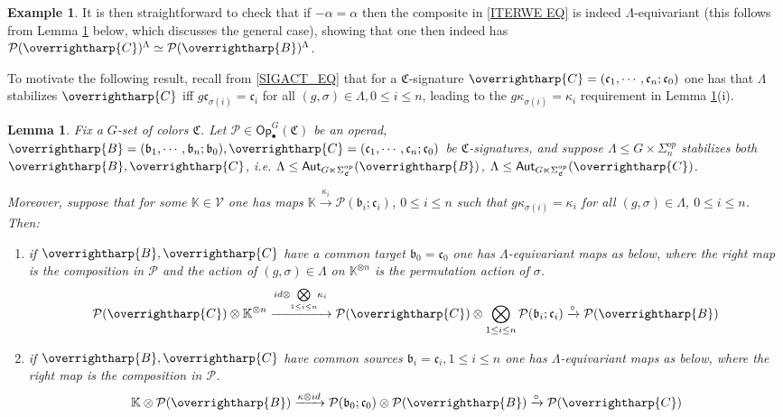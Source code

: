 \documentclass[a4paper,10pt
,draft
]{article}%
\numberwithin{equation}{section}
\numberwithin{figure}{section}
\newtheorem{lemma}[equation]{Lemma}%
\theoremstyle{definition} %
\newtheorem{example}[equation]{Example}%
\newcommand{\vect}[1]{\text{\overrightharp{\ensuremath{#1}}}}
\newcommand{\V}{\ensuremath{\mathcal V}}
\renewcommand{\P}{\ensuremath{\mathcal P}}
\newcommand{\1}{\ensuremath{\mathbbm 1}}%
\begin{document}
\begin{example}
It is then straightforward to check that if $-\alpha = \alpha$
then the composite in \eqref{ITERWE EQ}
is indeed $\Lambda$-equivariant
(this follows from Lemma \ref{LAMBEQMAPS LEM} below, which discusses the general case), showing that one then indeed has
$\P(\vect{C})^{\Lambda} \simeq \P(\vect{B})^{\Lambda}$.
\end{example}


To motivate the following result, 
recall from \eqref{SIGACT_EQ} that
for a $\mathfrak{C}$-signature
$\vect{C} = (\mathfrak{c}_1,\cdots,\mathfrak{c}_n;\mathfrak{c}_0)$
one has that $\Lambda$ stabilizes $\vect{C}$
iff 
$g \mathfrak{c}_{\sigma(i)} = \mathfrak{c}_i$
for all $(g,\sigma) \in \Lambda, 0\leq i \leq n$,
leading to the $g \kappa_{\sigma(i)} = \kappa_i$
requirement in Lemma \ref{LAMBEQMAPS LEM}(i).



\begin{lemma}\label{LAMBEQMAPS LEM}
Fix a $G$-set of colors $\mathfrak{C}$.
Let $\P \in \mathsf{Op}^G_\bullet(\mathfrak{C})$ be an operad,
$\vect{B}=(\mathfrak{b}_1,\cdots,\mathfrak{b}_n;\mathfrak{b}_0),\vect{C}=(\mathfrak{c}_1,\cdots,\mathfrak{c}_n;\mathfrak{c}_0)$ be $\mathfrak{C}$-signatures,
and suppose 
$\Lambda \leq G \times \Sigma_n^{op}$
stabilizes both $\vect{B},\vect{C}$, i.e. 
$\Lambda \leq \mathsf{Aut}_{G\ltimes \Sigma_{\mathfrak{C}}^{op}}(\vect{B})$, 
$\Lambda \leq \mathsf{Aut}_{G\ltimes \Sigma_{\mathfrak{C}}^{op}}(\vect{C})$.

Moreover, suppose that for some $\mathbb{K} \in \V$
one has maps 
$\mathbb{K} \xrightarrow{\kappa_i} \P(\mathfrak{b}_i;\mathfrak{c}_i)$,  $0\leq i \leq n$
such that $g\kappa_{\sigma(i)} = \kappa_i$ for all $(g,\sigma) \in \Lambda$, $0\leq i \leq n$. Then:
\begin{enumerate}[label=(\roman*)]
\item if $\vect{B},\vect{C}$ have a common target $\mathfrak{b}_0=\mathfrak{c}_0$
one has
$\Lambda$-equivariant maps as below, where the right map is the composition in $\P$
and the action of $(g,\sigma) \in \Lambda$ on $\mathbb{K}^{\otimes n}$
is the permutation action of $\sigma$.
\begin{equation}\label{LAMBEQMAPS EQ}
	\P(\vect{C}) \otimes %
	\mathbb{K}^{\otimes n}
\xrightarrow{id \otimes \underset{1\leq i \leq n}{\bigotimes} \kappa_i}
	\P(\vect{C}) \otimes \bigotimes_{1\leq i \leq n} \P(\mathfrak{b}_i;\mathfrak{c}_i)
	\xrightarrow{\circ}
	\P(\vect{B})
\end{equation}
\item
if $\vect{B},\vect{C}$ have common sources $\mathfrak{b}_i=\mathfrak{c}_i,1\leq i \leq n$ 
one has
$\Lambda$-equivariant maps as below, where the right map is the composition in $\P$.
\[
	\mathbb{K} \otimes \P(\vect{B}) 
\xrightarrow{\kappa \otimes id}
	\P(\mathfrak{b}_0;\mathfrak{c}_0) \otimes \P(\vect{B}) 
	\xrightarrow{\circ}
	\P(\vect{C})
\]
\end{enumerate}
\end{lemma}
\end{document}
